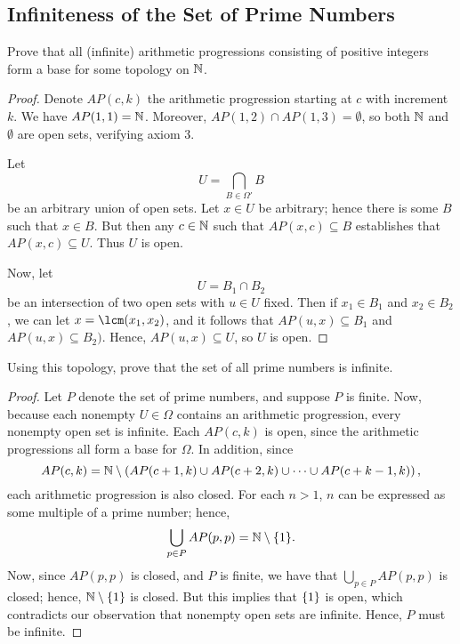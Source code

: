 \subsection{Infiniteness of the Set of Prime Numbers}

\begin{minorEx}
    Prove that all (infinite) arithmetic progressions consisting of positive
    integers form a base for some topology on $\mathbb{N}$.
\end{minorEx}

\begin{proof}
    Denote $AP(c,k)$ the arithmetic progression starting at $c$ with increment
    $k$. We have $AP(1,1) = \mathbb{N}$. Moreover, $AP(1,2) \cap AP(1,3) = \emptyset$,
    so both $\mathbb{N}$ and $\emptyset$ are open sets, verifying axiom 3.

    Let 
    \[
        U = \bigcap_{B \in \Omega'} B
    \]
    be an arbitrary union of open sets. Let $x \in U$ be arbitrary; hence there
    is some $B$ such that $x \in B$. But then any $c \in \mathbb{N}$ such that $AP(x,
    c) \subseteq B$ establishes that $AP(x, c) \subseteq U$. Thus $U$ is open.

    Now, let
    \[
        U = B_1 \cap B_2
    \]
    be an intersection of two open sets with $u \in U$ fixed. Then if $x_1 \in
    B_1$ and $x_2 \in B_2$, we can let $x = \lcm(x_1, x_2)$, and it follows that
    $AP(u,x) \subseteq B_1$ and $AP(u,x) \subseteq B_2)$. Hence, $AP(u, x)
    \subseteq U$, so $U$ is open.
\end{proof}

\begin{minorEx}
    Using this topology, prove that the set of all prime numbers is infinite.
\end{minorEx}

\begin{proof}
    Let $P$ denote the set of prime numbers, and suppose $P$ is finite. Now,
    because each nonempty $U \in \Omega$ contains an arithmetic progression,
    every nonempty open set is infinite. Each $AP(c,k)$ is open, since the
    arithmetic progressions all form a base for $\Omega$. In addition, since
    \[
        AP(c, k) = \mathbb{N} \setminus \left( AP(c+1,k) \cup AP(c+2, k) \cup \cdots
        \cup AP(c+k-1, k) \right),
    \]
    each arithmetic progression is also closed. For each $n > 1$, $n$ can be
    expressed as some multiple of a prime number; hence,
    \[
        \bigcup_{p \in P} AP(p,p) = \mathbb{N} \setminus \{1\}.
    \]
    Now, since $AP(p,p)$ is closed, and $P$ is finite, we have that $\bigcup_{p
    \in P} AP(p,p)$ is closed; hence, $\mathbb{N}\setminus\{1\}$ is closed. But this
    implies that $\{1\}$ is open, which contradicts our observation that
    nonempty open sets are infinite. Hence, $P$ must be infinite.
\end{proof}
